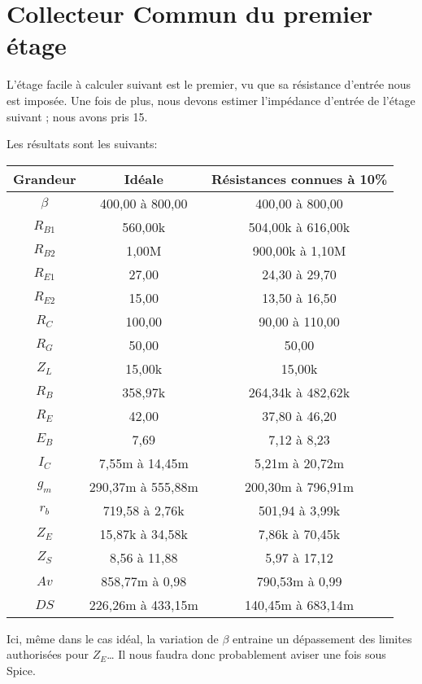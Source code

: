   \section{Collecteur Commun du premier étage}
   L’étage facile à calculer suivant est le premier, vu que sa résistance d’entrée
   nous est imposée.
   Une fois de plus, nous devons estimer l’impédance d’entrée de l’étage suivant ; 
   nous avons pris 15\kilo\ohm.

   Les résultats sont les suivants:

   \begin{tabular}{|c|c|c|}
    \hline
 Grandeur  &       Idéale    &  Résistances connues à 10\% \\\hline
 $\beta$   & 400,00 à 800,00 & 400,00 à 800,00 \\\hline
 $R_{B1}$  &     560,00k      &504,00k à 616,00k\\\hline
 $R_{B2}$  &      1,00M       & 900,00k à 1,10M \\\hline
 $R_{E1}$  &      27,00       &  24,30 à 29,70  \\\hline
 $R_{E2}$  &      15,00       &  13,50 à 16,50  \\\hline
 $R_C$     &      100,00      & 90,00 à 110,00  \\\hline
 $R_G$     &      50,00       &      50,00       \\\hline
 $Z_L$     &      15,00k      &      15,00k      \\\hline
 $R_B$     &     358,97k      &264,34k à 482,62k\\\hline
 $R_E$     &      42,00       &  37,80 à 46,20  \\\hline
 $E_B$     &       7,69       &   7,12 à 8,23   \\\hline
 $I_C$     & 7,55m à 14,45m  & 5,21m à 20,72m  \\\hline
 $g_m$     &290,37m à 555,88m&200,30m à 796,91m\\\hline
 $r_b$     & 719,58 à 2,76k  & 501,94 à 3,99k  \\\hline
 $Z_E$     & 15,87k à 34,58k & 7,86k à 70,45k  \\\hline
 $Z_S$     &  8,56 à 11,88   &  5,97 à 17,12   \\\hline
 $Av$      & 858,77m à 0,98  & 790,53m à 0,99  \\\hline
 $DS$      &226,26m à 433,15m&140,45m à 683,14m\\\hline
\end{tabular}

    Ici, même dans le cas idéal, la variation de $\beta$ entraine un dépassement des
    limites authorisées pour $Z_E$… Il nous faudra donc probablement aviser une fois 
    sous Spice.

